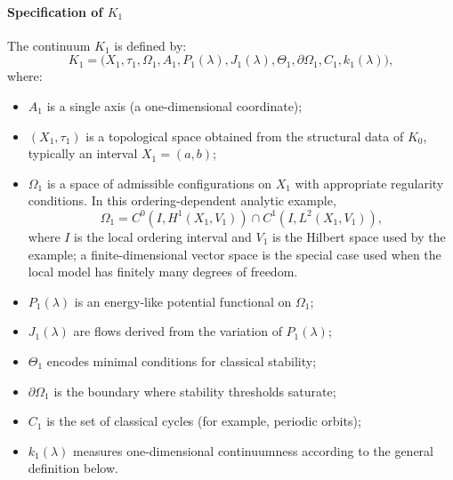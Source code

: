 \paragraph{Specification of \texorpdfstring{\(K_1\)}{K\_1}}
The continuum \(K_1\) is defined by:
\[
    K_1 = \big(X_1,\tau_1,\Omega_1,A_1,P_1(\lambda),J_1(\lambda),\Theta_1,\partial\Omega_1,C_1,k_1(\lambda)\big),
\]
where:
\begin{itemize}
    \item \(A_1\) is a single axis (a one-dimensional coordinate);
    \item \((X_1,\tau_1)\) is a topological space obtained from the structural data of \(K_0\), typically an interval \(X_1 = (a,b)\);
    \item \(\Omega_1\) is a space of admissible configurations on \(X_1\) with appropriate regularity conditions.
          In this ordering-dependent analytic example,
          \[
              \Omega_1 = C^0(I,H^1(X_1,V_1)) \cap C^1(I,L^2(X_1,V_1)),
          \]
          where \(I\) is the local ordering interval and \(V_1\) is the Hilbert space
          used by the example; a finite-dimensional vector space is the
          special case used when the local model has finitely many degrees of
          freedom.
    \item \(P_1(\lambda)\) is an energy-like potential functional on \(\Omega_1\);
    \item \(J_1(\lambda)\) are flows derived from the variation of \(P_1(\lambda)\);
    \item \(\Theta_1\) encodes minimal conditions for classical stability;
    \item \(\partial\Omega_1\) is the boundary where stability thresholds saturate;
    \item \(C_1\) is the set of classical cycles (for example, periodic orbits);
    \item \(k_1(\lambda)\) measures one-dimensional continuumness according to the general definition below.
\end{itemize}

